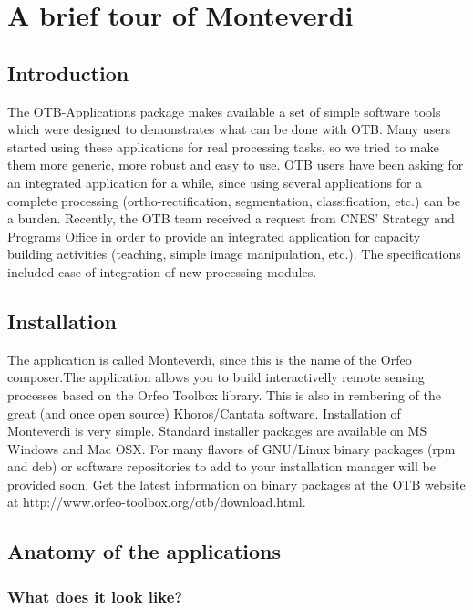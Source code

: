 \chapter{A brief tour of Monteverdi}\label{chap:Monteverdi} 

\section{Introduction}\label{sec:montintro}
The OTB-Applications package makes available a set of simple software
tools which were designed to demonstrates what can be done with
OTB. Many users started using these applications for real processing
tasks, so we tried to make them more generic, more robust and easy to
use. OTB users have been asking for an integrated application for a
while, since using several applications for a complete processing
(ortho-rectification, segmentation, classification, etc.) can be a
burden. Recently, the OTB team received a request from CNES' Strategy
and Programs Office in order to provide an integrated application for
capacity building activities (teaching, simple image manipulation,
etc.). The specifications included ease of integration of new
processing modules.  

\section{Installation}\label{sec:montinstall} 
The application is called Monteverdi, since this is the name of the Orfeo
composer.The application allows you to build interactivelly remote
sensing processes based on the Orfeo Toolbox library. This is also in
rembering of the great (and once open source) Khoros/Cantata
software.  Installation of Monteverdi is very simple. Standard
installer packages are available on MS Windows and Mac OSX.  For many
flavors of GNU/Linux binary packages (rpm and deb) or software
repositories to add to your installation manager will be provided
soon. Get the latest information on binary packages at the OTB website
at http://www.orfeo-toolbox.org/otb/download.html.

\section{Anatomy of the applications}\label{sec:anatomy}

\subsection{What does it look like?}

